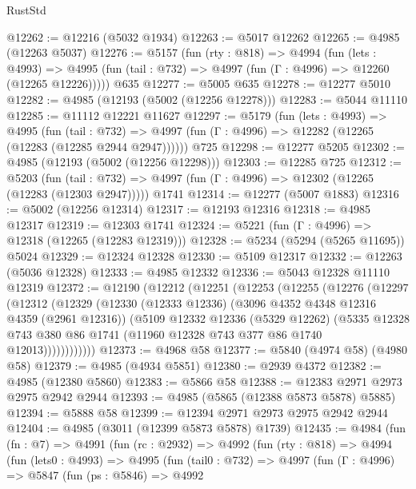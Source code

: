 \begin{lexlean}{RustStd}
\begin{coremodule}
@12262 := @12216 (@5032 @1934)
@12263 := @5017 @12262
@12265 := @4985 (@12263 @5037)
@12276 := @5157
    (fun (rty : @818) =>
    @4994
      (fun (lets : @4993) =>
      @4995 (fun (tail : @732) => @4997 (fun (Γ : @4996) => @12260 (@12265 @12226)))))
    @635
@12277 := @5005 @635
@12278 := @12277 @5010
@12282 := @4985 (@12193 (@5002 (@12256 @12278)))
@12283 := @5044 @11110
@12285 := @11112 @12221 @11627
@12297 := @5179
    (fun (lets : @4993) =>
    @4995
      (fun (tail : @732) =>
      @4997 (fun (Γ : @4996) => @12282 (@12265 (@12283 (@12285 @2944 @2947))))))
    @725
@12298 := @12277 @5205
@12302 := @4985 (@12193 (@5002 (@12256 @12298)))
@12303 := @12285 @725
@12312 := @5203
    (fun (tail : @732) => @4997 (fun (Γ : @4996) => @12302 (@12265 (@12283 (@12303 @2947)))))
    @1741
@12314 := @12277 (@5007 @1883)
@12316 := @5002 (@12256 @12314)
@12317 := @12193 @12316
@12318 := @4985 @12317
@12319 := @12303 @1741
@12324 := @5221 (fun (Γ : @4996) => @12318 (@12265 (@12283 @12319)))
@12328 := @5234 (@5294 (@5265 @11695)) @5024
@12329 := @12324 @12328
@12330 := @5109 @12317
@12332 := @12263 (@5036 @12328)
@12333 := @4985 @12332
@12336 := @5043 @12328 @11110 @12319
@12372 := @12190
    (@12212
      (@12251
        (@12253
          (@12255
            (@12276
              (@12297
                (@12312
                  (@12329
                    (@12330
                      (@12333 @12336)
                      (@3096 @4352 @4348 @12316 @4359 (@2961 @12316))
                      (@5109
                        @12332
                        @12336
                        (@5329 @12262)
                        (@5335
                          @12328
                          @743
                          @380
                          @86
                          @1741
                          (@11960 @12328 @743 @377 @86 @1740 @12013))))))))))))
@12373 := @4968 @58
@12377 := @5840 (@4974 @58) (@4980 @58)
@12379 := @4985 (@4934 @5851)
@12380 := @2939 @4372
@12382 := @4985 (@12380 @5860)
@12383 := @5866 @58
@12388 := @12383 @2971 @2973 @2975 @2942 @2944
@12393 := @4985 (@5865 (@12388 @5873 @5878) @5885)
@12394 := @5888 @58
@12399 := @12394 @2971 @2973 @2975 @2942 @2944
@12404 := @4985 (@3011 (@12399 @5873 @5878) @1739)
@12435 := @4984
    (fun (fn : @7) =>
    @4991
      (fun (rc : @2932) =>
      @4992
        (fun (rty : @818) =>
        @4994
          (fun (lets0 : @4993) =>
          @4995
            (fun (tail0 : @732) =>
            @4997
              (fun (Γ : @4996) =>
              @5847
                (fun (ps : @5846) =>
                @4992

\end{coremodule}
\end{lexlean}

